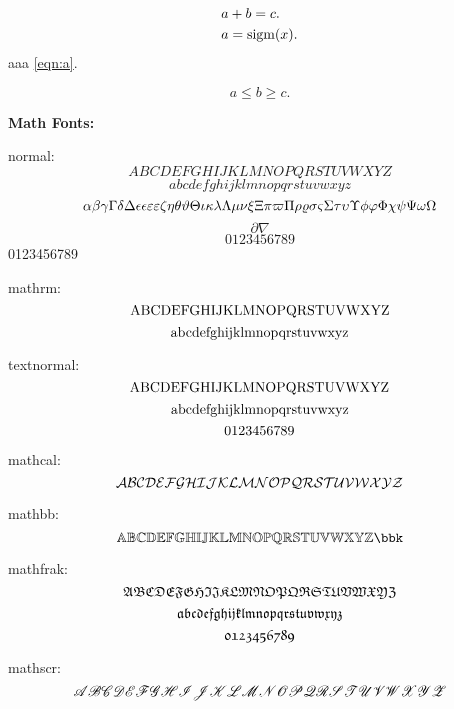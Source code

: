 \documentclass{article}
\begin{document}
\begin{align}
  & a + b = c. \\
  & a = \sigm(x).
  \label{eqn:a}
\end{align}
aaa \eqref{eqn:a}. \ie{} \eg{} \etc{} \etal

\[
  a \le b \ge c.
\]

\textbf{Math Fonts:}

normal:
\[ A B C D E F G H I J K L M N O P Q R S T U V W X Y Z \]
\[ a b c d e f g h i j k l m n o p q r s t u v w x y z \]
\[ \alpha \beta \gamma \Gamma \delta \Delta \epsilon \eps \varepsilon \veps \zeta \eta \theta \vartheta \Theta \iota \kappa \lambda \Lambda \mu \nu \xi \Xi \pi \varpi \Pi \rho \varrho \sigma \varsigma \Sigma \tau \upsilon \Upsilon \phi \varphi \Phi \chi \psi \Psi \omega \Omega \]
\[ \partial \nabla \]
\[0123456789\]
0123456789

mathrm:
\[ \rmA \rmB \rmC \rmD \rmE \rmF \rmG \rmH \rmI \rmJ \rmK \rmL \rmM \rmN \rmO \rmP \rmQ \rmR \rmS \rmT \rmU \rmV \rmW \rmX \rmY \rmZ \]
\[ \rmaa \rmbb \rmcc \rmdd \rmee \rmff \rmgg \rmhh \rmii \rmjj \rmkk \rmll \rmmm \rmnn \rmoo \rmpp \rmqq \rmrr \rmss \rmtt \rmuu \rmvv \rmww \rmxx \rmyy \rmzz \]

textnormal:
\[ \tnA \tnB \tnC \tnD \tnE \tnF \tnG \tnH \tnI \tnJ \tnK \tnL \tnM \tnN \tnO \tnP \tnQ \tnR \tnS \tnT \tnU \tnV \tnW \tnX \tnY \tnZ \]
\[ \tnaa \tnbb \tncc \tndd \tnee \tnff \tngg \tnhh \tnii \tnjj \tnkk \tnll \tnmm \tnnn \tnoo \tnpp \tnqq \tnrr \tnss \tntt \tnuu \tnvv \tnww \tnxx \tnyy \tnzz \]
\[ \tnzro \tnone \tntwo \tnthr \tnfor \tnfiv \tnsix \tnsev \tneit \tnnin \]

mathcal:
\[ \clA \clB \clC \clD \clE \clF \clG \clH \clI \clJ \clK \clL \clM \clN \clO \clP \clQ \clR \clS \clT \clU \clV \clW \clX \clY \clZ \]

mathbb:
\[ \bbA \bbB \bbC \bbD \bbE \bbF \bbG \bbH \bbI \bbJ \bbK \bbL \bbM \bbN \bbO \bbP \bbQ \bbR \bbS \bbT \bbU \bbV \bbW \bbX \bbY \bbZ \bbk \]

mathfrak:
\[ \frA \frB \frC \frD \frE \frF \frG \frH \frI \frJ \frK \frL \frM \frN \frO \frP \frQ \frR \frS \frT \frU \frV \frW \frX \frY \frZ \]
\[ \fraa \frbb \frcc \frdd \free \frff \frgg \frhh \frii \frjj \frkk \frll \frmm \frnn \froo \frpp \frqq \frrr \frss \frtt \fruu \frvv \frww \frxx \fryy \frzz \]
\[ \frzro \frone \frtwo \frthr \frfor \frfiv \frsix \frsev \freit \frnin \]

mathscr:
\[ \scA \scB \scC \scD \scE \scF \scG \scH \scI \scJ \scK \scL \scM \scN \scO \scP \scQ \scR \scS \scT \scU \scV \scW \scX \scY \scZ \]
\end{document}
